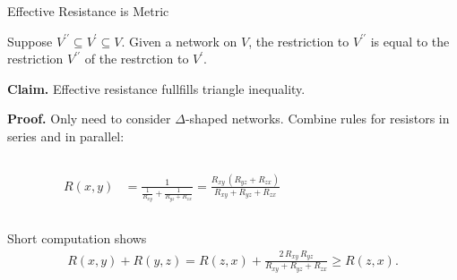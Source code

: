 \begin{frame}{Effective Resistance is Metric}
    \begin{theorem}
        Suppose $V^{\prime\prime} \subseteq V^{\prime} \subseteq V$. Given a network on $V$, the restriction to $V^{\prime\prime}$ is equal to the restriction $V^{\prime\prime}$ of the restrction to $V^{\prime}$.
    \end{theorem}
    \bigskip
    
    \textbf{Claim.} Effective resistance fullfills triangle inequality.
    \bigskip

    \textbf{Proof.} Only need to consider $\Delta$-shaped networks. Combine rules for resistors in series and in parallel:

    \begin{columns}[c]
        \begin{column}{.7\textwidth}
            \begin{align*}
                R(x,y) &= \frac{1}{\frac{1}{R_{xy}} + \frac{1}{R_{yz} + R_{zx}}}
                = \frac{R_{xy}\,(R_{yz} + R_{zx})}{R_{xy} + R_{yz} + R_{zx}}
            \end{align*}
        \end{column}

        \begin{column}{.2\textwidth}
            \centering
        \end{column}
    \end{columns}
    
    Short computation shows
    \begin{align*}
        R(x,y) + R(y,z) = R(z,x) + \frac{2\, R_{xy}\, R_{yz}}{R_{xy} + R_{yz} + R_{zx}} \geq R(z,x).
    \end{align*}   
\end{frame}

